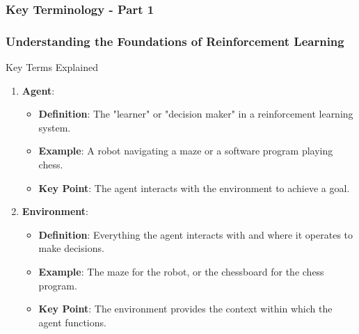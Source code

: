 \documentclass[aspectratio=169]{beamer}
\begin{document}
\begin{frame}[fragile]
    \frametitle{Key Terminology - Part 1}
    \frametitle{Understanding the Foundations of Reinforcement Learning}
    
    \begin{block}{Key Terms Explained}
        \begin{enumerate}
            \item \textbf{Agent}: 
                \begin{itemize}
                    \item \textbf{Definition}: The "learner" or "decision maker" in a reinforcement learning system.
                    \item \textbf{Example}: A robot navigating a maze or a software program playing chess.
                    \item \textbf{Key Point}: The agent interacts with the environment to achieve a goal.
                \end{itemize}
            \item \textbf{Environment}:
                \begin{itemize}
                    \item \textbf{Definition}: Everything the agent interacts with and where it operates to make decisions.
                    \item \textbf{Example}: The maze for the robot, or the chessboard for the chess program.
                    \item \textbf{Key Point}: The environment provides the context within which the agent functions.
                \end{itemize}
        \end{enumerate}
    \end{block}
\end{frame}
\end{document}
